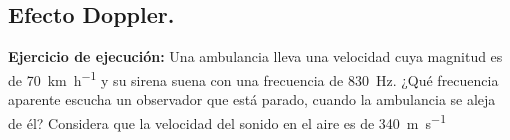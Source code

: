 \documentclass[12pt]{exam}
\begin{document}
\begin{questions}



    \setcounter{section}{3}

    \section{Efecto Doppler.}

    \setcounter{question}{10} \question \textbf{Ejercicio de ejecución: } Una ambulancia lleva una velocidad cuya magnitud es de \SI{70}{\kilo\meter\per\hour} y su sirena suena con una frecuencia de \SI{830}{\hertz}. ¿Qué frecuencia aparente escucha un observador que está parado, cuando la ambulancia se aleja de él? Considera que la velocidad del sonido en el aire es de \SI{340}{\meter\per\second}


\end{questions}
\end{document}
